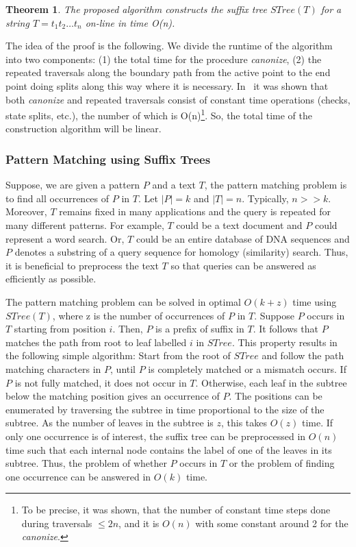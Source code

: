 \documentclass[paper=a4, fontsize=11pt]{scrartcl} %
\numberwithin{equation}{section} %
\numberwithin{figure}{section} %
\numberwithin{table}{section} %
\newtheorem{theorem}{Theorem}[section]
\begin{document}
\begin{theorem}
\label{theorem:suffix-tree-theorem}
The proposed algorithm constructs the suffix tree $STree(T)$ for a string $T = t_1 t_2 \dots t_n$ on-line in time O(n).
\end{theorem}

\par The idea of the proof is the following. We divide the runtime of the algorithm into two components: (1) the total time for the procedure \textit{canonize}, (2) the repeated traversals along the boundary path from the active point to the end point doing splits along this way where it is necessary. In~\cite{ukkonen1995line} it was shown that both \textit{canonize} and repeated traversals consist of constant time operations (checks, state splits, etc.), the number of which is O(n)\footnote{To be precise, it was shown, that the number of constant time steps done during traversals $\le 2n$, and it is $O(n)$ with some constant around 2 for the \textit{canonize}.}. So, the total time of the construction algorithm will be linear.

\subsubsection{Pattern Matching using Suffix Trees}
\par Suppose, we are given a pattern $P$ and a text $T$, the pattern matching problem is to find all occurrences of $P$ in $T$. Let $|P| = k$ and $|T| = n$. Typically, $n >> k$. Moreover, $T$ remains fixed in many applications and the query is repeated for many different patterns. For example, $T$ could be a text document and $P$ could represent a word search. Or, $T$ could be an entire database of DNA sequences and $P$ denotes a substring of a query sequence for homology (similarity) search. Thus, it is beneficial to preprocess the text $T$ so that queries can be answered as efficiently as possible.

\par The pattern matching problem can be solved in optimal $O(k+z)$ time using $STree(T)$, where z is the number of occurrences of $P$ in $T$. Suppose $P$ occurs in $T$ starting from position $i$. Then, $P$ is a prefix of suffix in $T$. It follows that $P$ matches the path from root to leaf labelled $i$ in $STree$. This property results in the following simple algorithm: Start from the root of $STree$ and follow the path matching characters in $P$, until $P$ is completely matched or a mismatch occurs. If $P$ is not fully matched, it does not occur in $T$. Otherwise, each leaf in the subtree below the matching position gives an occurrence of $P$. The positions can be enumerated by traversing the subtree in time proportional to the size of the subtree. As the number of leaves in the subtree is $z$, this takes $O(z)$ time. If only one occurrence is of interest, the suffix tree can be preprocessed in $O(n)$ time such that each internal node contains the label of one of the leaves in its subtree. Thus, the problem of whether $P$ occurs in $T$ or the problem of finding one occurrence can be answered in $O(k)$ time.
\end{document}
